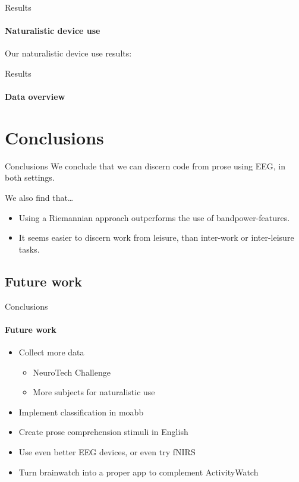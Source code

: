 \documentclass[xcolor={dvipsnames,table},12pt]{beamer}
\newif\ifplacelogo{}  %
\begin{document}
\begin{frame}{Results}
    \framesubtitle{Naturalistic device use}
    Our naturalistic device use results:

    \begin{adjustbox}{width=0.8\textwidth, float=table}
        
    \end{adjustbox}
\end{frame}

\placelogofalse{}
\begin{frame}{Results}
    \framesubtitle{Data overview}
    {
        \tiny
        
    }
\end{frame}
\placelogotrue{}

\section{Conclusions}
\begin{frame}{Conclusions}
    We conclude that we can discern code from prose using EEG, in both settings.

    We also find that\ldots
    \begin{itemize}
        \item Using a Riemannian approach outperforms the use of bandpower-features.
        \item It seems easier to discern work from leisure, than inter-work or inter-leisure tasks.
    \end{itemize}
\end{frame}

\subsection{Future work}
\begin{frame}{Conclusions}
    \framesubtitle{Future work}

    \begin{itemize}
        \item Collect more data
        \begin{itemize}
            \item NeuroTech Challenge
            \item More subjects for naturalistic use
        \end{itemize}
        \item Implement classification in moabb
        \item Create prose comprehension stimuli in English
        \item Use even better EEG devices, or even try fNIRS
        \item Turn brainwatch into a proper app to complement ActivityWatch
    \end{itemize}
\end{frame}
\end{document}
